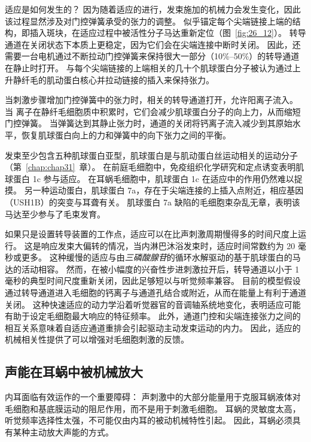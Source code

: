适应是如何发生的？
因为随着适应的进行，发束施加的机械力会发生变化，因此该过程显然涉及对门控弹簧承受的张力的调整。
似乎锚定每个尖端链接上端的结构，即插入斑块，在适应过程中被活性分子马达重新定位（图~\ref{fig:26_12}）。
转导通道在关闭状态下本质上更稳定，因为它们会在尖端连接中断时关闭。
因此，还需要一台电机通过不断拉动门控弹簧来保持很大一部分（10\%–50\%）的转导通道在静止时打开。
与每个尖端链接的上端相关的几十个肌球蛋白分子被认为通过上升静纤毛的肌动蛋白核心并拉动链接的插入来保持张力。


当刺激步骤增加门控弹簧中的张力时，相关的转导通道打开，允许阳离子流入。
当  离子在静纤毛细胞质中积累时，它们会减少肌球蛋白分子的向上力，从而缩短门控弹簧。
当弹簧达到其静止张力时，通道的关闭将钙离子流入减少到其原始水平，恢复肌球蛋白向上的力和弹簧中的向下张力之间的平衡。


发束至少包含五种肌球蛋白亚型，肌球蛋白是与肌动蛋白丝运动相关的运动分子（第~\ref{chap:chap31}~章）。
在前庭毛细胞中，免疫组织化学研究和定点诱变表明肌球蛋白 1c 参与适应。
在耳蜗毛细胞中，肌球蛋白 1c 在适应中的作用仍然难以捉摸。
另一种运动蛋白，肌球蛋白 7a，存在于尖端连接的上插入点附近，相应基因（USH1B）的突变与耳聋有关。
肌球蛋白 7a 缺陷的毛细胞束杂乱无章，表明该马达至少参与了毛束发育。


如果只是设置转导装置的工作点，适应可以在比声刺激周期慢得多的时间尺度上运行。
这是响应发束大偏转的情况，当内淋巴沐浴发束时，适应时间常数约为 20 毫秒或更多。
这种缓慢的适应与由\textit{三磷酸腺苷}的循环水解驱动的基于肌球蛋白的马达的活动相容。
然而，在被小幅度的兴奋性步进刺激拉开后，转导通道以小于 1 毫秒的典型时间尺度重新关闭，因此足够短以与听觉频率兼容。
目前的模型假设通过转导通道进入毛细胞的钙离子与通道孔结合或附近，从而在能量上有利于通道关闭。
这种快速适应的动力学沿着听觉器官的音调轴系统地变化，表明适应可能有助于设定毛细胞最大响应的特征频率。
此外，通道门控和尖端连接张力之间的相互关系意味着自适应通道重排会引起驱动主动发束运动的内力。
因此，适应的机械相关性提供了可以增强对毛细胞刺激的反馈。


\subsection{声能在耳蜗中被机械放大}

内耳面临有效运作的一个重要障碍：
声刺激中的大部分能量用于克服耳蜗液体对毛细胞和基底膜运动的阻尼作用，而不是用于刺激毛细胞。
耳蜗的灵敏度太高，听觉频率选择性太强，不可能仅由内耳的被动机械特性引起。
因此，耳蜗必须具有某种主动放大声能的方式。


